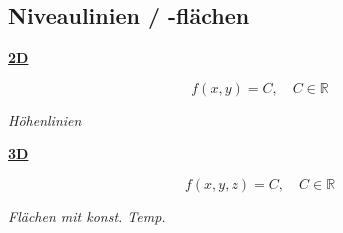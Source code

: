 \subsection{Niveaulinien / -flächen}
    \vspace{0.5em}
    \begin{minipage}{0.4\linewidth}
        \begin{center}
            \underline{\textbf{2D}}
        \end{center}
        $$
            f(x,y) = C , \quad C \in \mathbb{R}
        $$
        \begin{center}
            \textit{Höhenlinien}
        \end{center}
    \end{minipage}
    \hspace{0.05\linewidth}
    \begin{minipage}{0.5\linewidth}
        \begin{center}
            \underline{\textbf{3D}}
        \end{center}
        $$
            f(x,y,z) = C , \quad C \in \mathbb{R}
        $$
        \begin{center}
            \textit{Flächen mit konst. Temp.}
        \end{center}
    \end{minipage}
